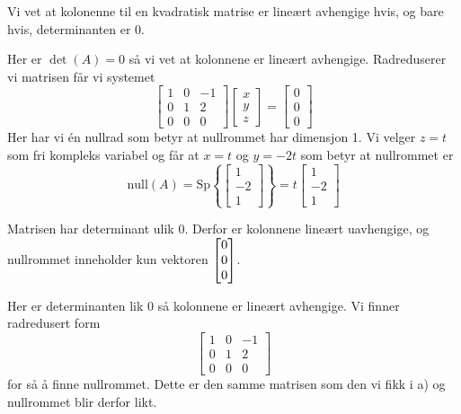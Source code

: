 \begin{losning}
Vi vet at kolonenne til en kvadratisk matrise er lineært avhengige hvis, og bare hvis, determinanten er $0$.
\begin{punkt}
	Her er $\det(A) = 0$ så vi vet at kolonnene er lineært avhengige. Radreduserer vi matrisen får vi systemet
	\begin{equation*}
		\begin{bmatrix}
			1 & 0 & -1 \\
			0 & 1 & 2 \\
			0 & 0 & 0 
		\end{bmatrix}
		\begin{bmatrix}
			x \\ y \\ z
		\end{bmatrix}
		=
		\begin{bmatrix}
			0 \\ 0 \\ 0
		\end{bmatrix}
	\end{equation*}
	Her har vi én nullrad som betyr at nullrommet har dimensjon 1. Vi velger $z=t$ som fri kompleks variabel og får at $x=t$ og $y = -2t$ som betyr at nullrommet er
	\begin{equation*}
		\mathrm{null}(A) = \mathrm{Sp}\left\{\begin{bmatrix}1 \\ -2 \\ 1\end{bmatrix}\right\} = t\begin{bmatrix}1 \\ -2 \\ 1\end{bmatrix}
	\end{equation*}
\end{punkt}
\begin{punkt}
	Matrisen har determinant ulik 0. Derfor er kolonnene lineært uavhengige, og nullrommet inneholder kun vektoren $\begin{bmatrix} 0 \\ 0 \\ 0 \end{bmatrix}$.
\end{punkt}
\begin{punkt}
	Her er determinanten lik 0 så kolonnene er lineært avhengige. Vi finner radredusert form
	\begin{equation*}
		\begin{bmatrix}
			1 & 0 & -1 \\
			0 & 1 & 2 \\
			0 & 0 & 0 
		\end{bmatrix}
	\end{equation*}
	for så å finne nullrommet. Dette er den samme matrisen som den vi fikk i a) og nullrommet blir derfor likt. %
\end{punkt}
\end{losning}



